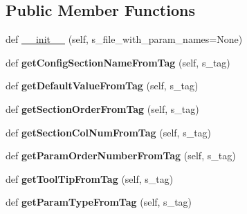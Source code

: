 \subsection*{Public Member Functions}
\begin{DoxyCompactItemize}
\item 
def \hyperlink{classnegui_1_1pgparamset_1_1PGParamSet_a598ea6a166f56fe5be01f86d4d8c91ba}{\+\_\+\+\_\+init\+\_\+\+\_\+} (self, s\+\_\+file\+\_\+with\+\_\+param\+\_\+names=None)
\item 
def {\bfseries get\+Config\+Section\+Name\+From\+Tag} (self, s\+\_\+tag)\hypertarget{classnegui_1_1pgparamset_1_1PGParamSet_a03c4b8dd0c3728cdcb7bf02ca0e673cb}{}\label{classnegui_1_1pgparamset_1_1PGParamSet_a03c4b8dd0c3728cdcb7bf02ca0e673cb}

\item 
def {\bfseries get\+Default\+Value\+From\+Tag} (self, s\+\_\+tag)\hypertarget{classnegui_1_1pgparamset_1_1PGParamSet_ade081db3140f50468abf16d320b76a12}{}\label{classnegui_1_1pgparamset_1_1PGParamSet_ade081db3140f50468abf16d320b76a12}

\item 
def {\bfseries get\+Section\+Order\+From\+Tag} (self, s\+\_\+tag)\hypertarget{classnegui_1_1pgparamset_1_1PGParamSet_a2bf1131707ba0e0cfa4c2d17e4d76ba4}{}\label{classnegui_1_1pgparamset_1_1PGParamSet_a2bf1131707ba0e0cfa4c2d17e4d76ba4}

\item 
def {\bfseries get\+Section\+Col\+Num\+From\+Tag} (self, s\+\_\+tag)\hypertarget{classnegui_1_1pgparamset_1_1PGParamSet_ae6e2a60dde8d9152b17e7a7d9ecbed59}{}\label{classnegui_1_1pgparamset_1_1PGParamSet_ae6e2a60dde8d9152b17e7a7d9ecbed59}

\item 
def {\bfseries get\+Param\+Order\+Number\+From\+Tag} (self, s\+\_\+tag)\hypertarget{classnegui_1_1pgparamset_1_1PGParamSet_a24d65e7f2a64e79820c04767de1895ca}{}\label{classnegui_1_1pgparamset_1_1PGParamSet_a24d65e7f2a64e79820c04767de1895ca}

\item 
def {\bfseries get\+Tool\+Tip\+From\+Tag} (self, s\+\_\+tag)\hypertarget{classnegui_1_1pgparamset_1_1PGParamSet_afd0f17941dc1e421f299c751266b3bb0}{}\label{classnegui_1_1pgparamset_1_1PGParamSet_afd0f17941dc1e421f299c751266b3bb0}

\item 
def {\bfseries get\+Param\+Type\+From\+Tag} (self, s\+\_\+tag)\hypertarget{classnegui_1_1pgparamset_1_1PGParamSet_a391775e1ec6ef31d6240f354bc695d09}{}\label{classnegui_1_1pgparamset_1_1PGParamSet_a391775e1ec6ef31d6240f354bc695d09}


\end{DoxyCompactItemize}
